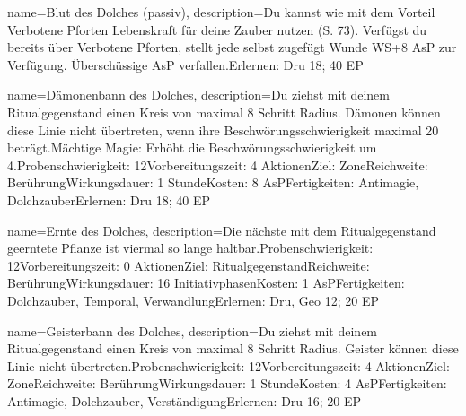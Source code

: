 {
    name={Blut des Dolches (passiv)},
    description={Du kannst wie mit dem Vorteil Verbotene Pforten Lebenskraft für deine Zauber nutzen (S. 73). Verfügst du bereits über Verbotene Pforten, stellt jede selbst zugefügt Wunde WS+8 AsP zur Verfügung. Überschüssige AsP verfallen.\newline Erlernen: Dru 18; 40 EP}
}


{
    name={Dämonenbann des Dolches},
    description={Du ziehst mit deinem Ritualgegenstand einen Kreis von maximal 8 Schritt Radius. Dämonen können diese Linie nicht übertreten, wenn ihre Beschwörungsschwierigkeit maximal 20 beträgt.\newline Mächtige Magie: Erhöht die Beschwörungsschwierigkeit um 4.\newline Probenschwierigkeit: 12\newline Vorbereitungszeit: 4 Aktionen\newline Ziel: Zone\newline Reichweite: Berührung\newline Wirkungsdauer: 1 Stunde\newline Kosten: 8 AsP\newline Fertigkeiten: Antimagie, Dolchzauber\newline Erlernen: Dru 18; 40 EP}
}


{
    name={Ernte des Dolches},
    description={Die nächste mit dem Ritualgegenstand geerntete Pflanze ist viermal so lange haltbar.\newline   Probenschwierigkeit: 12\newline Vorbereitungszeit: 0 Aktionen\newline Ziel: Ritualgegenstand\newline Reichweite: Berührung\newline Wirkungsdauer: 16 Initiativphasen\newline Kosten: 1 AsP\newline Fertigkeiten: Dolchzauber, Temporal, Verwandlung\newline Erlernen: Dru, Geo 12; 20 EP}
}


{
    name={Geisterbann des Dolches},
    description={Du ziehst mit deinem Ritualgegenstand einen Kreis von maximal 8 Schritt Radius. Geister können diese Linie nicht übertreten.\newline Probenschwierigkeit: 12\newline Vorbereitungszeit: 4 Aktionen\newline Ziel: Zone\newline Reichweite: Berührung\newline Wirkungsdauer: 1 Stunde\newline Kosten: 4 AsP\newline Fertigkeiten: Antimagie, Dolchzauber, Verständigung\newline Erlernen: Dru 16; 20 EP}
}


